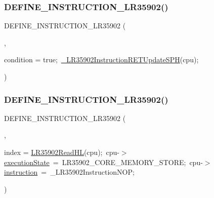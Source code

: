 \subsubsection{\texorpdfstring{D\+E\+F\+I\+N\+E\+\_\+\+I\+N\+S\+T\+R\+U\+C\+T\+I\+O\+N\+\_\+\+L\+R35902()}{DEFINE\_INSTRUCTION\_LR35902()}\hspace{0.1cm}{\footnotesize\ttfamily [5/20]}}
{\footnotesize\ttfamily D\+E\+F\+I\+N\+E\+\_\+\+I\+N\+S\+T\+R\+U\+C\+T\+I\+O\+N\+\_\+\+L\+R35902 (\begin{DoxyParamCaption}\item[{R\+ET}]{,  }\item[{cpu-\/$>$}]{condition = {\ttfamily true;~\mbox{\hyperlink{isa-lr35902_8c_adad03232cfc22b6a8b3290d9dfc22823}{\+\_\+\+L\+R35902\+Instruction\+R\+E\+T\+Update\+S\+PH}}(cpu);} }\end{DoxyParamCaption})}

\mbox{\label{isa-lr35902_8c_a04616f66e2b43e846c5d5d41768c66b7}} 
\subsubsection{\texorpdfstring{D\+E\+F\+I\+N\+E\+\_\+\+I\+N\+S\+T\+R\+U\+C\+T\+I\+O\+N\+\_\+\+L\+R35902()}{DEFINE\_INSTRUCTION\_LR35902()}\hspace{0.1cm}{\footnotesize\ttfamily [6/20]}}
{\footnotesize\ttfamily D\+E\+F\+I\+N\+E\+\_\+\+I\+N\+S\+T\+R\+U\+C\+T\+I\+O\+N\+\_\+\+L\+R35902 (\begin{DoxyParamCaption}\item[{L\+D\+H\+L\+\_\+\+Bus}]{,  }\item[{cpu-\/$>$}]{index = {\ttfamily \mbox{\hyperlink{isa-lr35902_8c_a2aecac31902540d73a813542994471ff}{L\+R35902\+Read\+HL}}(cpu);~cpu-\/$>$\mbox{\hyperlink{isa-lr35902_8c_a087a53d4d283226a73c530dd2883d634}{execution\+State}}~=~LR35902\+\_\+CORE\+\_\+MEMORY\+\_\+STORE;~cpu-\/$>$\mbox{\hyperlink{isa-lr35902_8c_a516462a0e821c76277faaeb2a1364b35}{instruction}}~=~\+\_\+LR35902InstructionNOP;} }\end{DoxyParamCaption})}

